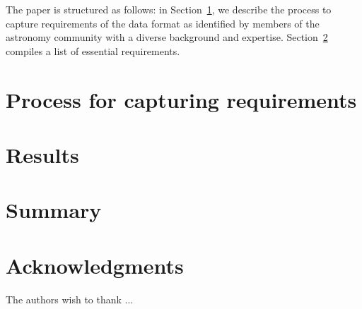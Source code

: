 \documentclass[final,authoryear,5p,times,twocolumn]{elsarticle}
\begin{document}
The paper is structured as follows: in Section~\ref{process}, we describe the
process to capture requirements of the data format as identified by members of
the astronomy community with a diverse background and expertise.
Section~\ref{results} compiles a list of essential requirements.

\section{Process for capturing requirements}
\label{process}

\section{Results}
\label{results}

\section{Summary}

\section{Acknowledgments}


The authors wish to thank ...



\end{document}
